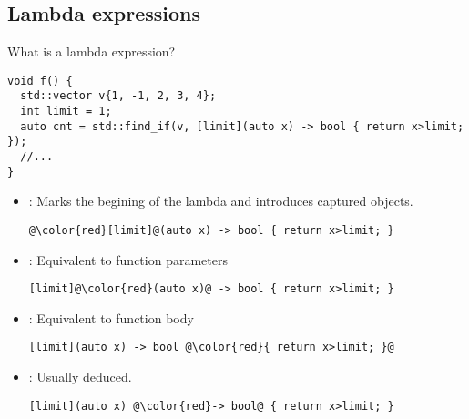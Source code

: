 \subsection{Lambda expressions}

\begin{frame}[t,fragile]{What is a lambda expression?}
\begin{lstlisting}
void f() {
  std::vector v{1, -1, 2, 3, 4};
  int limit = 1;
  auto cnt = std::find_if(v, [limit](auto x) -> bool { return x>limit; });
  //...
}
\end{lstlisting}
\begin{itemize}
  \item {}: Marks the begining of the lambda and introduces
        captured objects.
\begin{lstlisting}[escapechar=@]
@\color{red}[limit]@(auto x) -> bool { return x>limit; }
\end{lstlisting}

  \item {}: Equivalent to function parameters
\begin{lstlisting}[escapechar=@]
[limit]@\color{red}(auto x)@ -> bool { return x>limit; }
\end{lstlisting}

  \item {}: Equivalent to function body
\begin{lstlisting}[escapechar=@]
[limit](auto x) -> bool @\color{red}{ return x>limit; }@
\end{lstlisting}

  \item {}: Usually deduced.
\begin{lstlisting}[escapechar=@]
[limit](auto x) @\color{red}-> bool@ { return x>limit; }
\end{lstlisting}

\end{itemize}
\end{frame}


